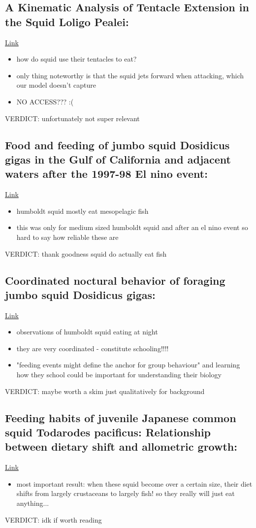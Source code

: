 \documentclass[12pt]{article}
\begin{document}
\subsection{A Kinematic Analysis of Tentacle Extension in the Squid Loligo Pealei: \cite{kier}}
\href{https://doi.org/10.1242/jeb.200.1.41}{Link}
\begin{itemize}
    \item how do squid use their tentacles to eat?
    \item only thing noteworthy is that the squid jets forward when attacking, which our model doesn't capture
    \item NO ACCESS??? :(
\end{itemize}
VERDICT: unfortunately not super relevant

\subsection{Food and feeding of jumbo squid Dosidicus gigas in the Gulf of California and adjacent waters after the 1997-98 El nino event: \cite{markaida}}
\href{https://doi.org/10.1016/j.fishres.2006.02.016}{Link}
\begin{itemize}
    \item humboldt squid mostly eat mesopelagic fish
    \item this was only for medium sized humboldt squid and after an el nino event so hard to say how reliable these are
\end{itemize}
VERDICT: thank goodness squid do actually eat fish

\subsection{Coordinated noctural behavior of foraging jumbo squid Dosidicus gigas: \cite{benoit-bird}}
\href{https://doi.org/10.3354/meps09664}{Link}
\begin{itemize}
    \item observations of humboldt squid eating at night
    \item they are very coordinated - constitute schooling!!!!
    \item "feeding events might define the anchor for group behaviour" and learning how they school could be important for understanding their biology
\end{itemize}
VERDICT: maybe worth a skim just qualitatively for background

\subsection{Feeding habits of juvenile Japanese common squid Todarodes pacificus: Relationship between dietary shift and allometric growth: \cite{uchikawa}}
\href{https://doi.org/10.1016/j.fishres.2013.07.001}{Link}
\begin{itemize}
    \item most important result: when these squid become over a certain size, their diet shifts from largely crustaceans to largely fish! so they really will just eat anything...
\end{itemize}
VERDICT: idk if worth reading
\end{document}
